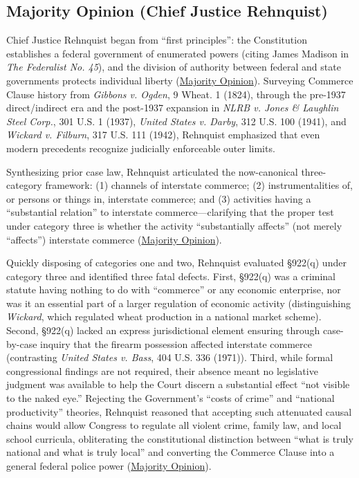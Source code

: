 \documentclass[12pt]{article}
\begin{document}
\subsection{Majority Opinion (Chief Justice Rehnquist)}
Chief Justice Rehnquist began from ``first principles'': the Constitution establishes a federal government of enumerated powers (citing James Madison in \textit{The Federalist No. 45}), and the division of authority between federal and state governments protects individual liberty (\href{https://www.law.cornell.edu/supct/html/93-1260.ZO.html}{Majority Opinion}). Surveying Commerce Clause history from \textit{Gibbons v. Ogden}, 9 Wheat. 1 (1824), through the pre-1937 direct/indirect era and the post-1937 expansion in \textit{NLRB v. Jones \& Laughlin Steel Corp.}, 301 U.S. 1 (1937), \textit{United States v. Darby}, 312 U.S. 100 (1941), and \textit{Wickard v. Filburn}, 317 U.S. 111 (1942), Rehnquist emphasized that even modern precedents recognize judicially enforceable outer limits.

Synthesizing prior case law, Rehnquist articulated the now-canonical three-category framework: (1) channels of interstate commerce; (2) instrumentalities of, or persons or things in, interstate commerce; and (3) activities having a ``substantial relation'' to interstate commerce---clarifying that the proper test under category three is whether the activity ``substantially affects'' (not merely ``affects'') interstate commerce (\href{https://www.law.cornell.edu/supct/html/93-1260.ZO.html}{Majority Opinion}).

Quickly disposing of categories one and two, Rehnquist evaluated \S 922(q) under category three and identified three fatal defects. First, \S 922(q) was a criminal statute having nothing to do with ``commerce'' or any economic enterprise, nor was it an essential part of a larger regulation of economic activity (distinguishing \textit{Wickard}, which regulated wheat production in a national market scheme). Second, \S 922(q) lacked an express jurisdictional element ensuring through case-by-case inquiry that the firearm possession affected interstate commerce (contrasting \textit{United States v. Bass}, 404 U.S. 336 (1971)). Third, while formal congressional findings are not required, their absence meant no legislative judgment was available to help the Court discern a substantial effect ``not visible to the naked eye.'' Rejecting the Government's ``costs of crime'' and ``national productivity'' theories, Rehnquist reasoned that accepting such attenuated causal chains would allow Congress to regulate all violent crime, family law, and local school curricula, obliterating the constitutional distinction between ``what is truly national and what is truly local'' and converting the Commerce Clause into a general federal police power (\href{https://www.law.cornell.edu/supct/html/93-1260.ZO.html}{Majority Opinion}).
\end{document}
